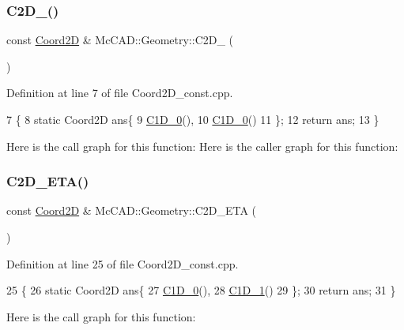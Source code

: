 \subsubsection{\texorpdfstring{C2\+D\+\_()}{C2D\_0()}}
{\footnotesize\ttfamily const \hyperlink{classMcCAD_1_1Geometry_1_1Coord2D}{Coord2D} \& Mc\+C\+A\+D\+::\+Geometry\+::\+C2\+D\+\_ (\begin{DoxyParamCaption}{ }\end{DoxyParamCaption})}



Definition at line 7 of file Coord2\+D\+\_\+const.\+cpp.


\begin{DoxyCode}
7                     \{
8     \textcolor{keyword}{static} Coord2D ans\{
9         \hyperlink{namespaceMcCAD_1_1Geometry_aef0aab16ba6382b032e4e3a8a5d37b94}{C1D\_0}(),
10         \hyperlink{namespaceMcCAD_1_1Geometry_aef0aab16ba6382b032e4e3a8a5d37b94}{C1D\_0}()
11     \};
12     \textcolor{keywordflow}{return} ans;
13 \}
\end{DoxyCode}
Here is the call graph for this function\+:
Here is the caller graph for this function\+:
\mbox{\label{namespaceMcCAD_1_1Geometry_a31a700c18fb6302d53490b7744e1c57f}} 
\subsubsection{\texorpdfstring{C2\+D\+\_\+\+E\+T\+A()}{C2D\_ETA()}}
{\footnotesize\ttfamily const \hyperlink{classMcCAD_1_1Geometry_1_1Coord2D}{Coord2D} \& Mc\+C\+A\+D\+::\+Geometry\+::\+C2\+D\+\_\+\+E\+TA (\begin{DoxyParamCaption}{ }\end{DoxyParamCaption})}



Definition at line 25 of file Coord2\+D\+\_\+const.\+cpp.


\begin{DoxyCode}
25                       \{
26     \textcolor{keyword}{static} Coord2D ans\{
27         \hyperlink{namespaceMcCAD_1_1Geometry_aef0aab16ba6382b032e4e3a8a5d37b94}{C1D\_0}(),
28         \hyperlink{namespaceMcCAD_1_1Geometry_ad7994c2ae088570476d26d338aa22cff}{C1D\_1}()
29     \};
30     \textcolor{keywordflow}{return} ans;
31 \}
\end{DoxyCode}
Here is the call graph for this function\+:
\mbox{\label{namespaceMcCAD_1_1Geometry_a14ff5fd2db066e4dfad0a638f03762a2}} 
